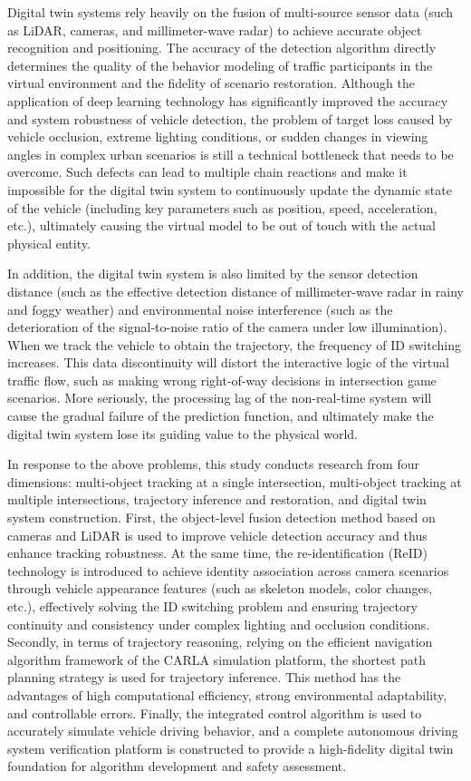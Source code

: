 \documentclass[lettersize,journal]{IEEEtran}
\begin{document}
Digital twin systems rely heavily on the fusion of multi-source sensor data (such as LiDAR, cameras, and millimeter-wave radar) to achieve accurate object recognition and positioning. The accuracy of the detection algorithm directly determines the quality of the behavior modeling of traffic participants in the virtual environment and the fidelity of scenario restoration. 
Although the application of deep learning technology has significantly improved the accuracy and system robustness of vehicle detection, the problem of target loss caused by vehicle occlusion, extreme lighting conditions, or sudden changes in viewing angles in complex urban scenarios is still a technical bottleneck that needs to be overcome\cite{Alpher23c}.
Such defects can lead to multiple chain reactions and make it impossible for the digital twin system to continuously update the dynamic state of the vehicle (including key parameters such as position, speed, acceleration, etc.), ultimately causing the virtual model to be out of touch with the actual physical entity.

In addition, the digital twin system is also limited by the sensor detection distance (such as the effective detection distance of millimeter-wave radar in rainy and foggy weather) and environmental noise interference (such as the deterioration of the signal-to-noise ratio of the camera under low illumination). 
When we track the vehicle to obtain the trajectory, the frequency of ID switching increases. 
This data discontinuity will distort the interactive logic of the virtual traffic flow, such as making wrong right-of-way decisions in intersection game scenarios. 
More seriously, the processing lag of the non-real-time system will cause the gradual failure of the prediction function, and ultimately make the digital twin system lose its guiding value to the physical world.

In response to the above problems, this study conducts research from four dimensions: multi-object tracking at a single intersection, multi-object tracking at multiple intersections, trajectory inference and restoration, and digital twin system construction. 
First, the object-level fusion detection method based on cameras and LiDAR is used to improve vehicle detection accuracy and thus enhance tracking robustness. 
At the same time, the re-identification (ReID) technology is introduced to achieve identity association across camera scenarios through vehicle appearance features (such as skeleton models, color changes, etc.), effectively solving the ID switching problem and ensuring trajectory continuity and consistency under complex lighting and occlusion conditions\cite{Alpher23}. 
Secondly, in terms of trajectory reasoning, relying on the efficient navigation algorithm framework of the CARLA simulation platform, the shortest path planning strategy is used for trajectory inference. 
This method has the advantages of high computational efficiency, strong environmental adaptability, and controllable errors. 
Finally, the integrated control algorithm is used to accurately simulate vehicle driving behavior, and a complete autonomous driving system verification platform is constructed to provide a high-fidelity digital twin foundation for algorithm development and safety assessment\cite{Alpher24c}.
\end{document}
